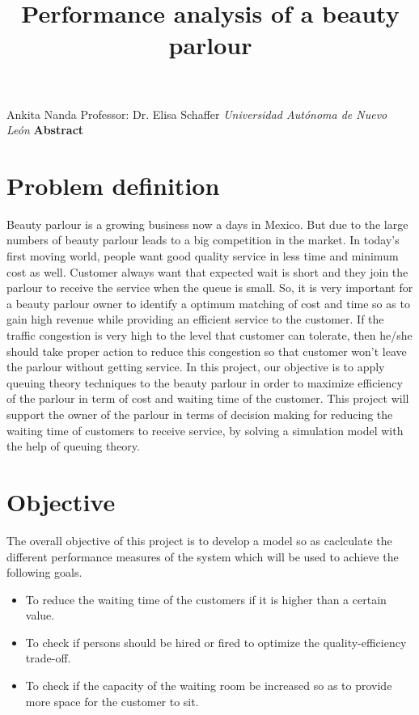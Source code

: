 \documentclass{article}
\title { \Large{ \textbf {Performance analysis of a beauty parlour}}}
\date{ }
\theoremstyle{definition}
\begin{document}
 \maketitle 
\begin{center}{Ankita Nanda \break Professor: Dr. Elisa Schaffer}\break
 \small \textit {Universidad Aut{\'o}noma de Nuevo Le{\'o}n}\break\break \break
 \large{ \textbf {Abstract}}
\end{center}



\section{Problem definition}
Beauty parlour is a growing business now a days in Mexico. But due to the large numbers of beauty parlour leads to a big competition in the market. In today's first moving world, people want good quality service in less time and minimum cost as well. Customer always want that expected wait is short and they join the parlour to receive the service when the queue is small. So, it is very important for a beauty parlour owner to identify a optimum matching of cost and time so as to gain high revenue while providing an efficient service to the customer. If the traffic congestion is very high to the level that customer can tolerate, then he/she should take proper action to reduce this congestion so that customer won't leave the parlour without getting service.
	In this project, our objective is to apply queuing theory techniques to the beauty parlour in order to maximize efficiency of the parlour in term of cost and waiting time of the customer. This project will support the owner of the parlour in terms of decision making for reducing the waiting time of customers to receive service, by solving a simulation model with the help of queuing theory.

\section{Objective}
The overall objective of this project is to develop a model so as caclculate the different performance measures of the system which will be used to achieve the following goals.

\begin{itemize}
\item To reduce the waiting time of the customers if it is higher than a certain value.
\item To check if persons should be hired or fired to optimize the quality-efficiency trade-off. 
\item To check if the capacity of the waiting room be increased so as to provide more space for the customer to sit.

\end{itemize} 
\end{document}
